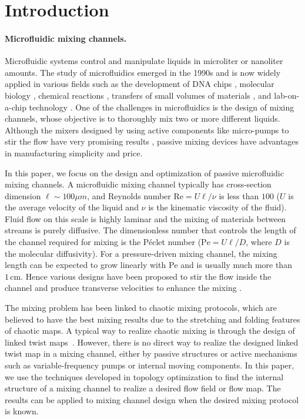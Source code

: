 \documentclass[times]{fldauth}
\begin{document}
%
%
\section{Introduction}
\label{sec:topoptintro}

\paragraph{Microfluidic mixing channels.}
Microfluidic systems control and manipulate liquids in microliter or
nanoliter amounts. The study of microfluidics emerged in the 1990s and
is now widely applied in various fields such as the development of DNA
chips \cite{Burns1998}, molecular biology \cite{DavidJ2002}, chemical
reactions \cite{Andersson2000}, transfers of small volumes of
materials \cite{Sammarco1999}, and lab-on-a-chip technology
\cite{weigl2003,Stone2004}. One of the challenges in microfluidics is
the design of mixing channels, whose objective is to thoroughly mix
two or more different liquids. Although the mixers designed by using
active components like micro-pumps to stir the flow have very
promising results \cite{Yang2000,Deshmukh2000}, passive mixing devices
have advantages in manufacturing simplicity and price.

In this paper, we focus on the design and optimization of passive
microfluidic mixing channels. A microfluidic mixing channel typically
has cross-section dimension $\ell\sim 100\mu m$, and Reynolds number
$\text{Re}=U\ell/\nu$ is less than $100$ \cite{Stroock2002} ($U$ is
the average velocity of the liquid and $\nu$ is the kinematic
viscosity of the fluid).  Fluid flow on this scale is highly laminar
and the mixing of materials between streams is purely diffusive. The
dimensionless number that controls the length of the channel required
for mixing is the P\'{e}clet number ($\text{Pe}= U\ell/D$, where $D$
is the molecular diffusivity). For a pressure-driven mixing channel,
the mixing length can be expected to grow linearly with $\text{Pe}$
and is usually much more than $1\,\text{cm}$. Hence various designs
have been proposed to stir the flow inside the channel and produce
transverse velocities to enhance the mixing \cite{Stroock2002,
  Ottino2004Science, Wiggins2004}.

The mixing problem has been linked to chaotic mixing protocols, which
are believed to have the best mixing results due to the stretching and
folding features of chaotic maps. A typical way to realize chaotic
mixing is through the design of linked twist
maps~\cite{Wiggins2004}. However, there is no direct way to realize
the designed linked twist map in a mixing channel, either by passive
structures or active mechanisms such as variable-frequency pumps or
internal moving components. In this paper, we use the techniques
developed in topology optimization to find the internal structure of a
mixing channel to realize a desired flow field or flow map. The
results can be applied to mixing channel design when the desired
mixing protocol is known.
\end{document}
